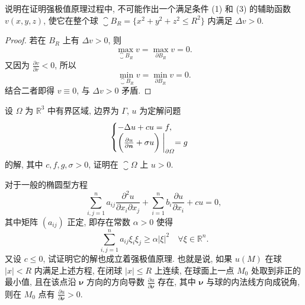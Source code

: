 \begin{exercise}
  说明在证明强极值原理过程中, 不可能作出一个满足条件 (1) 和 (3) 的辅助函数 $v(x,y,z)$,
  使它在整个球 $\closure{B}_R = \{x^2+y^2+z^2 \leq R^2\}$ 内满足 $\Delta v>0$.
\end{exercise}

\begin{proof}
  若在 $B_R$ 上有 $\Delta v>0$, 则
  \[\max_{\closure{B}_R} v = \max_{\partial B_R} v = 0.\]
  又因为 $\frac{\partial v}{\partial r} < 0$, 所以
  \[\min_{\closure{B}_R} v = \min_{\partial B_R} v = 0.\]
  结合二者即得 $v\equiv 0$, 与 $\Delta v>0$ 矛盾.
\end{proof}


\begin{exercise}
  设 $\varOmega$ 为 $\mathbb{R}^3$ 中有界区域, 边界为 $\varGamma$, $u$ 为定解问题
  \[\begin{cases}
    - \Delta u + cu = f, \\
    \biggl(\frac{\partial u}{\partial \bm{n}} + \sigma u\biggr)\biggm|_{\partial\varOmega} = g
  \end{cases}\]
  的解, 其中 $c,f,g,\sigma>0$, 证明在 $\closure{\varOmega}$ 上 $u>0$.
\end{exercise}


\begin{exercise}[6]
  对于一般的椭圆型方程
  \[\sum_{i,j=1}^n a_{ij}\frac{\partial^2u}{\partial x_i\partial x_j}
    + \sum_{i=1}^n b_i \frac{\partial u}{\partial x_i} + cu = 0,\]
  其中矩阵 $(a_{ij})$ 正定, 即存在常数 $\alpha>0$ 使得
  \[\sum_{i,j=1}^n a_{ij}\xi_i\xi_j \geq \alpha|\xi|^2\quad
    \forall\xi\in \mathbb{R}^n.\]
  又设 $c\leq 0$, 试证明它的解也成立着强极值原理.
  也就是说, 如果 $u(M)$ 在球 $|x|<R$ 内满足上述方程, 在闭球 $|x|\leq R$ 上连续,
  在球面上一点 $M_0$ 处取到非正的最小值, 且在该点沿 $\bm{\nu}$ 方向的方向导数
  $\frac{\partial u}{\partial \bm{\nu}}$ 存在, 其中 $\bm{\nu}$ 与球的内法线方向成锐角,
  则在 $M_0$ 点有 $\frac{\partial u}{\partial \bm{\nu}}>0$.
\end{exercise}

